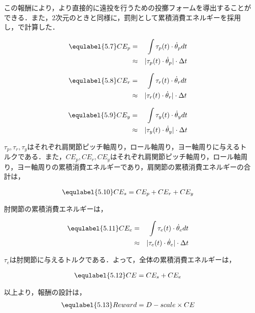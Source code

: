 この報酬により，より直接的に遠投を行うための投擲フォームを導出することができる．また，2次元のときと同様に，罰則として累積消費エネルギーを採用し，で計算した．

\begin{eqnarray}
  \equlabel{5.7}
  CE_{p}&=&\int \tau_{p}(t)\cdot\dot{\theta}_{p} dt\\
        &\approx&|\tau_{p}(t)\cdot\dot{\theta}_{p}|\cdot\Delta t
\end{eqnarray}

\begin{eqnarray}
  \equlabel{5.8}
  CE_{r}&=&\int \tau_{r}(t)\cdot\dot{\theta}_{r} dt\\
        &\approx&|\tau_{r}(t)\cdot\dot{\theta}_{r}|\cdot\Delta t
\end{eqnarray}

\begin{eqnarray}
  \equlabel{5.9}
  CE_{y}&=&\int \tau_{y}(t)\cdot\dot{\theta}_{y} dt\\
        &\approx&|\tau_{y}(t)\cdot\dot{\theta}_{y}|\cdot\Delta t
\end{eqnarray}

$\tau_{p},\tau_{r},\tau_{y}$はそれぞれ肩関節ピッチ軸周り，ロール軸周り，ヨー軸周りに与えるトルクである．また，$CE_{p},CE_{r},CE_{y}$はそれぞれ肩関節ピッチ軸周り，ロール軸周り，ヨー軸周りの累積消費エネルギーであり，肩関節の累積消費エネルギーの合計は，

\begin{eqnarray}
  \equlabel{5.10}
  CE_{s} = CE_{p} + CE_{r} + CE_{y}
\end{eqnarray}

肘関節の累積消費エネルギーは，

\begin{eqnarray}
  \equlabel{5.11}
  CE_{e}&=&\int \tau_{e}(t)\cdot\dot{\theta}_{e} dt\\
        &\approx&|\tau_{e}(t)\cdot\dot{\theta}_{e}|\cdot\Delta t
\end{eqnarray}

$\tau_{e}$は肘関節に与えるトルクである．よって，全体の累積消費エネルギーは，

\begin{eqnarray}
  \equlabel{5.12}
  CE = CE_{s} + CE_{e}
\end{eqnarray}

以上より，報酬の設計は，
\begin{eqnarray}
  \equlabel{5.13}
  Reward = D - scale \times CE
\end{eqnarray}


